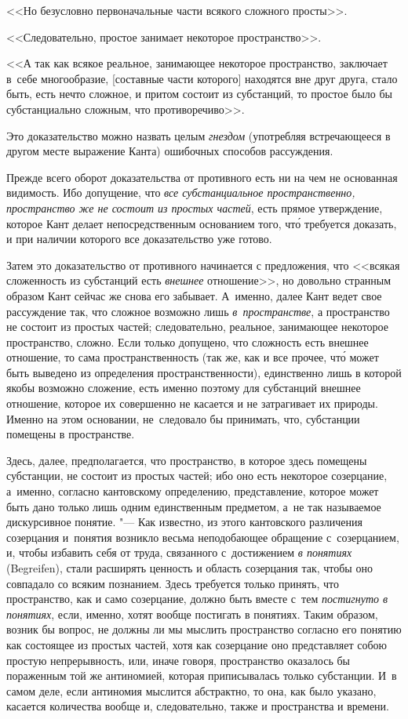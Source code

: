 <<Но безусловно первоначальные части всякого сложного просты>>.

<<Следовательно, простое занимает некоторое пространство>>.

<<А так как всякое реальное, занимающее некоторое пространство, заключает
в~себе многообразие, [составные части которого] находятся вне друг друга,
стало быть, есть нечто сложное, и притом состоит из субстанций, то простое
было бы субстанциально сложным, что противоречиво>>.

Это доказательство можно назвать целым {\em гнездом} (употребляя встречающееся
в другом месте выражение Канта) ошибочных способов рассуждения.

Прежде всего оборот доказательства от противного есть ни на чем не основанная
видимость. Ибо допущение, что {\em все субстанциальное пространственно,
пространство же не состоит из простых частей}, есть прямое утверждение,
которое Кант делает непосредственным основанием того, чт\'{о} требуется
доказать, и при наличии которого все доказательство уже готово.

Затем это доказательство от противного начинается с предложения, что <<всякая
сложенность из субстанций есть {\em внешнее} отношение>>, но довольно странным
образом Кант сейчас же снова его забывает. А~именно, далее Кант ведет свое
рассуждение так, что сложное возможно лишь {\em в~пространстве}, а пространство
не состоит из простых частей; следовательно, реальное, занимающее некоторое
пространство, сложно. Если только допущено, что сложность есть внешнее
отношение, то сама пространственность (так же, как и все прочее, чт\'{о} может
быть выведено из определения пространственности), единственно лишь в которой
якобы возможно сложение, есть именно поэтому для субстанций внешнее отношение,
которое их совершенно не касается и не затрагивает их природы. Именно на этом
основании, не~следовало бы принимать, что, субстанции помещены в пространстве.

Здесь, далее, предполагается, что пространство, в которое здесь помещены
субстанции, не состоит из простых частей; ибо оно есть некоторое созерцание,
а~именно, согласно кантовскому определению, представление, которое может быть
дано только лишь одним единственным предметом, а~не так называемое дискурсивное
понятие. "--- Как известно, из этого кантовского различения созерцания
и~понятия возникло весьма неподобающее обращение с~созерцанием, и, чтобы
избавить себя от труда, связанного с~достижением {\em в понятиях} (Begreifen),
стали расширять ценность и область созерцания так, чтобы оно совпадало со
всяким познанием. Здесь требуется только принять, что пространство, как и само
созерцание, должно быть вместе с~тем {\em постигнуто в понятиях}, если, именно,
хотят вообще постигать в понятиях. Таким образом, возник бы вопрос, не должны
ли мы мыслить пространство согласно его понятию как состоящее из простых
частей, хотя как созерцание оно представляет собою простую непрерывность, или,
иначе говоря, пространство оказалось бы пораженным той же антиномией, которая
приписывалась только субстанции. И~в самом деле, если антиномия мыслится
абстрактно, то она, как было указано, касается количества вообще и,
следовательно, также и пространства и времени.

